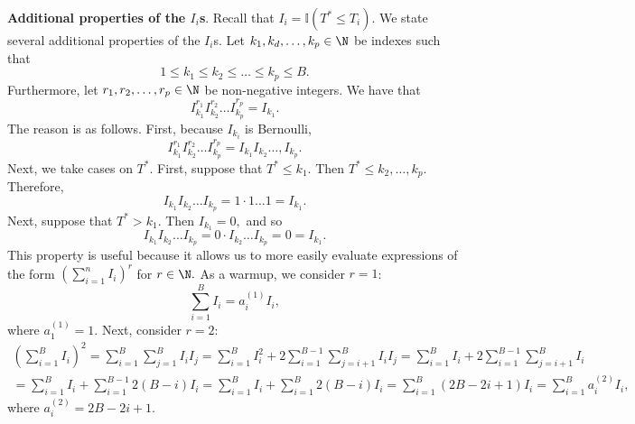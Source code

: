 \documentclass[12pt]{article}
\begin{document}
\textbf{Additional properties of the $I_i$s}. Recall that $I_i = \mathbb{I}(T^* \leq T_i).$ We state several additional properties of the $I_i$s. Let $k_1, k_d, \dots, k_p \in \N$ be indexes such that
$$ 1 \leq k_1 \leq k_2 \leq \dots \leq k_p \leq B.$$ Furthermore, let $r_1, r_2, \dots, r_p \in \N$ be non-negative integers. We have that
$$ I_{k_1}^{r_1} I_{k_2}^{r_2} \dots I_{k_p}^{r_p} = I_{k_1}.$$ The reason is as follows. First, because $I_{k_i}$ is Bernoulli,
$$  I_{k_1}^{r_1} I_{k_2}^{r_2} \dots I_{k_p}^{r_p} = I_{k_1} I_{k_2} \dots, I_{k_p}.$$ Next, we take cases on $T^*$. First, suppose that $T^* \leq k_1$. Then $T^* \leq k_2, \dots, k_p.$ Therefore,
$$I_{k_1} I_{k_2} \dots I_{k_p} = 1 \cdot 1 \dots 1 = I_{k_1}.$$ Next, suppose that $T^* > k_1$. Then $I_{k_1} = 0,$ and so
$$ I_{k_1} I_{k_2} \dots I_{k_p} = 0 \cdot I_{k_2} \dots I_{k_p} = 0 = I_{k_1}.$$
This property is useful because it allows us to more easily evaluate expressions of the form
$\left(\sum_{i=1}^n I_i \right)^r$ for $r \in \N.$ As a warmup, we consider $r = 1$:
$$ \sum_{i=1}^B I_i = a^{(1)}_i I_i,$$ where $a^{(1)}_1 = 1.$ Next, consider $r = 2$:
\begin{multline*}
\left( \sum_{i=1}^B I_i \right)^2 = \sum_{i=1} ^B\sum_{j=1}^B I_i I_j  = \sum_{i=1}^B I_i^2 + 2 \sum_{i = 1}^{B-1} \sum_{j=i+1}^{B} I_i I_j =  \sum_{i=1}^B I_i + 2 \sum_{i=1}^{B-1}  \sum_{j=i+1}^{B} I_i \\ = \sum_{i=1}^B I_i + \sum_{i=1}^{B-1} 2 (B-i) I_i = \sum_{i=1}^B I_i + \sum_{i=1}^B 2(B - i)I_i = \sum_{i=1}^B (2B - 2i + 1)I_i = \sum_{i=1}^B a^{(2)}_i I_i,
\end{multline*} 
where $a^{(2)}_i = 2B - 2i + 1$.
\end{document}
